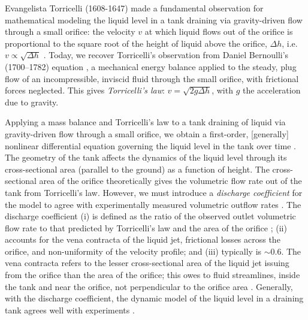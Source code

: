 \documentclass[openacc]{rsproca_new}%
\begin{document}

Evangelista Torricelli (1608-1647) made a fundamental observation for mathematical modeling the liquid level in a tank draining via gravity-driven flow through a small orifice: the velocity $v$ at which liquid flows out of the orifice is proportional to the square root of the height of liquid above the orifice, $\Delta h$, i.e. $v\propto \sqrt{\Delta h}$ \cite{mills1982newton}.
Today, we recover Torricelli's observation from Daniel Bernoulli's (1700–1782) equation \cite{welty2020fundamentals}, a mechanical energy balance applied to the steady, plug flow of an incompressible, inviscid fluid through the small orifice, with frictional forces neglected. This gives \emph{Torricelli's law}: $v=\sqrt{2 g \Delta h}$, with $g$ the acceleration due to gravity. \cite{d2021torricelli,teoman2022discharge}

Applying a mass balance and Torricelli's law to a tank draining of liquid via gravity-driven flow through a small orifice, we obtain a first-order, [generally] nonlinear differential equation governing the liquid level in the tank over time \cite{groetsch1993inverse,seborg2016process,debook}.
The geometry of the tank affects the dynamics of the liquid level through its cross-sectional area (parallel to the ground) as a function of height.
The cross-sectional area of the orifice theoretically gives the volumetric flow rate out of the tank from Torricelli's law. 
However, we must introduce a \emph{discharge coefficient} for the model to agree with experimentally measured volumetric outflow rates \cite{de2000pin,blasone2015discharge,wadhwa2021study,liu2008drainage}.
The discharge coefficient
(i) is defined as the ratio of the observed outlet volumetric flow rate to that predicted by Torricelli's law and the area of the orifice \cite{hicks2014determining};
(ii) accounts for the vena contracta of the liquid jet, frictional losses across the orifice, and non-uniformity of the velocity profile; and
(iii) typically is $\sim$0.6.
The vena contracta refers to the lesser cross-sectional area of the liquid jet issuing from the orifice than the area of the orifice; this owes to fluid streamlines, inside the tank and near the orifice, not perpendicular to the orifice area \cite{horsch2020simple}. 
\cite{teoman2022discharge,hicks2014determining,blasone2015discharge,lienhard1984velocity,wadhwa2021study}
Generally, with the discharge coefficient, the dynamic model of the liquid level in a draining tank agrees well with experiments \cite{farmer1992physical,driver1998torricelli,brady2009siphons,rother2024modelling,paldy1963apparatus,ivanov2014testing,williams2021vessel,pavesi2019investigating,planinvsivc2011holes,saleta2005experimental,lopac2015water,powell2012carrying}.
\end{document}
